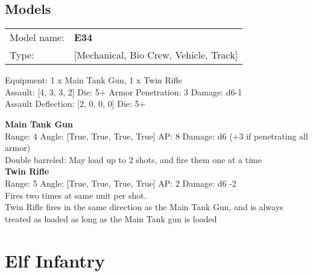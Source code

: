 \clearpage

\subsection{ Models }

\begin{tabular}{ll}
Model name: & {\bf E34 } \\
Type: & [Mechanical, Bio Crew, Vehicle, Track] \\
\end{tabular}

Equipment: 1 x Main Tank Gun, 1 x Twin Rifle \\

Assault: [4, 3, 3, 2] Die: 5+ Armor Penetration: 3 Damage: d6-1 \\
Assault Deflection: [2, 0, 0, 0] Die: 5+\\
\indent  



{\bf Main Tank Gun } \\



Range: 4  Angle: [True, True, True, True] AP: 8 Damage: d6 (+3 if penetrating all armor) \\
Double barreled: May load up to 2 shots, and fire them one at a time\\ 




{\bf Twin Rifle } \\



Range: 5  Angle: [True, True, True, True] AP: 2 Damage: d6 -2 \\
Fires two times at same unit per shot.\\Twin Rifle fires in the same direction as the Main Tank Gun, and is always treated as loaded as long as the Main Tank gun is loaded\\ 




 















\clearpage

\section{ Elf Infantry }

